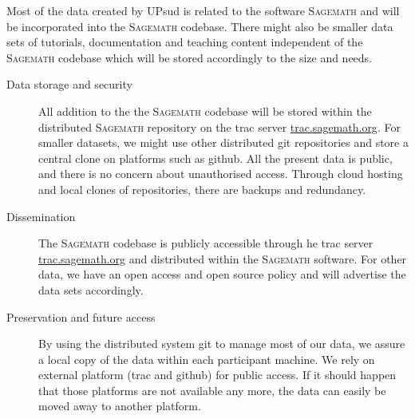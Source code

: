 \documentclass[12pt]{article}
\newcommand{\software}[1]{\textsc{#1}\xspace}
\newcommand{\Sage}{\software{Sagemath}}
\begin{document}
Most of the data created by UPsud is related to the software \Sage and will be incorporated into the \Sage codebase. There might also be smaller data sets of tutorials, documentation and teaching content independent of the \Sage codebase which will be stored accordingly to the size and needs.
\begin{description}
\item[Data storage and security] All addition to the the \Sage codebase will be stored within the distributed \Sage repository on the trac server \href{http://trac.sagemath.org/}{trac.sagemath.org}. For smaller datasets, we might use other distributed git repositories and store a central clone on platforms such as github. All the present data is public, and there is no concern about
unauthorised access. Through cloud hosting and local clones of
repositories, there are backups and redundancy.
\item[Dissemination] The \Sage codebase is publicly accessible through he trac server \href{http://trac.sagemath.org/}{trac.sagemath.org} and distributed within the \Sage software. For other data, we have an open access and open source policy and will advertise the data sets accordingly.
\item[Preservation and future access] By using the distributed system git to manage most of our data, we assure a local copy of the data within each participant machine. We rely on external platform (trac and github) for public access. If it should happen that those platforms are not available any more, the data can easily be moved away to another platform.
\end{description}
\end{document}
